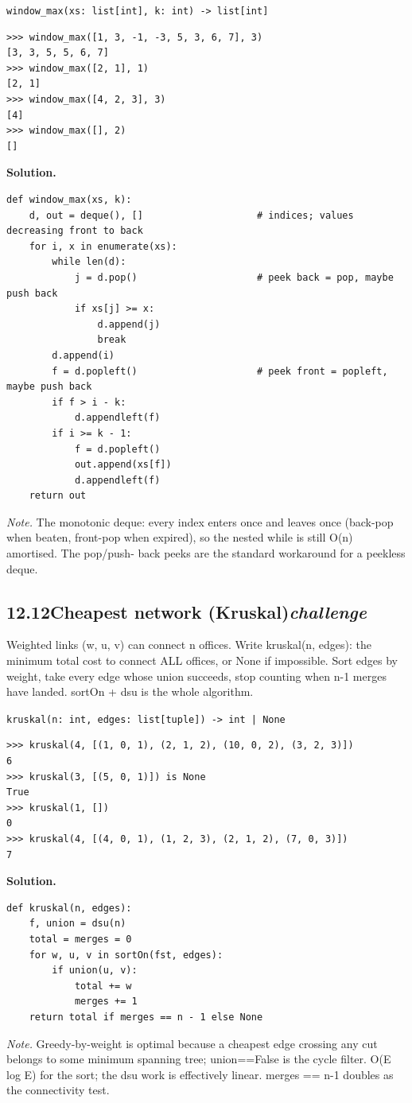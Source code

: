 \documentclass[10pt,letterpaper]{book}
\begin{document}
\noindent\texttt{window\_max(xs: list[int], k: int) -> list[int]}
\begin{lstlisting}[style=ex]
>>> window_max([1, 3, -1, -3, 5, 3, 6, 7], 3)
[3, 3, 5, 5, 6, 7]
>>> window_max([2, 1], 1)
[2, 1]
>>> window_max([4, 2, 3], 3)
[4]
>>> window_max([], 2)
[]
\end{lstlisting}
\noindent\textbf{Solution.}
\begin{lstlisting}[style=code]
def window_max(xs, k):
    d, out = deque(), []                    # indices; values decreasing front to back
    for i, x in enumerate(xs):
        while len(d):
            j = d.pop()                     # peek back = pop, maybe push back
            if xs[j] >= x:
                d.append(j)
                break
        d.append(i)
        f = d.popleft()                     # peek front = popleft, maybe push back
        if f > i - k:
            d.appendleft(f)
        if i >= k - 1:
            f = d.popleft()
            out.append(xs[f])
            d.appendleft(f)
    return out
\end{lstlisting}
\noindent\textit{Note.} The monotonic deque: every index enters once and leaves once (back-pop when beaten, front-pop when expired), so the nested while is still O(n) amortised. The pop/push- back peeks are the standard workaround for a peekless deque.

\subsection*{12.12\quad Cheapest network (Kruskal)\hfill\textnormal{\textit{challenge}}}
Weighted links (w, u, v) can connect n offices. Write kruskal(n, edges): the minimum total cost to connect ALL offices, or None if impossible. Sort edges by weight, take every edge whose union succeeds, stop counting when n-1 merges have landed. sortOn + dsu is the whole algorithm.

\noindent\texttt{kruskal(n: int, edges: list[tuple]) -> int | None}
\begin{lstlisting}[style=ex]
>>> kruskal(4, [(1, 0, 1), (2, 1, 2), (10, 0, 2), (3, 2, 3)])
6
>>> kruskal(3, [(5, 0, 1)]) is None
True
>>> kruskal(1, [])
0
>>> kruskal(4, [(4, 0, 1), (1, 2, 3), (2, 1, 2), (7, 0, 3)])
7
\end{lstlisting}
\noindent\textbf{Solution.}
\begin{lstlisting}[style=code]
def kruskal(n, edges):
    f, union = dsu(n)
    total = merges = 0
    for w, u, v in sortOn(fst, edges):
        if union(u, v):
            total += w
            merges += 1
    return total if merges == n - 1 else None
\end{lstlisting}
\noindent\textit{Note.} Greedy-by-weight is optimal because a cheapest edge crossing any cut belongs to some minimum spanning tree; union==False is the cycle filter. O(E log E) for the sort; the dsu work is effectively linear. merges == n-1 doubles as the connectivity test.
\end{document}
